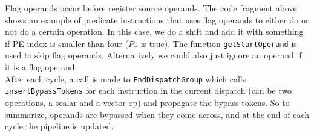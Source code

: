 Flag operands occur before register source operands. The code fragment above shows an example of predicate instructions that uses flag operands to either do or not do a certain operation. In this case, we do a shift and add it with something if PE index is smaller than four ($P1$ is true). The function \texttt{getStartOperand} is used to skip flag operands. Alternatively we could also just ignore an operand if it is a flag operand. \\

After each cycle, a call is made to \texttt{EndDispatchGroup} which calls \texttt{insertBypassTokens} for each instruction in the current dispatch (can be two operations, a scalar and a vector op) and propagate the bypass tokens. So to summarize, operands are bypassed when they come across, and at the end of each cycle the pipeline is updated. %





